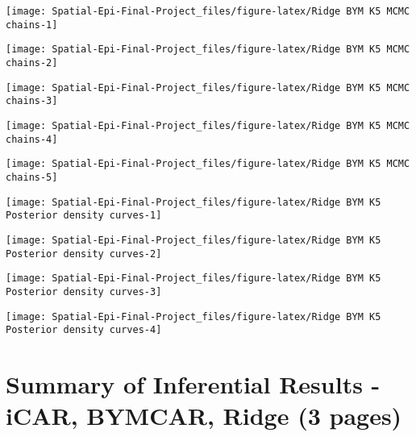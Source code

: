 \documentclass[]{article}
\begin{document}
\begin{center}\texttt{[image: Spatial-Epi-Final-Project\_files/figure-latex/Ridge BYM K5 MCMC chains-1]} \end{center}

\begin{center}\texttt{[image: Spatial-Epi-Final-Project\_files/figure-latex/Ridge BYM K5 MCMC chains-2]} \end{center}

\begin{center}\texttt{[image: Spatial-Epi-Final-Project\_files/figure-latex/Ridge BYM K5 MCMC chains-3]} \end{center}

\begin{center}\texttt{[image: Spatial-Epi-Final-Project\_files/figure-latex/Ridge BYM K5 MCMC chains-4]} \end{center}

\begin{center}\texttt{[image: Spatial-Epi-Final-Project\_files/figure-latex/Ridge BYM K5 MCMC chains-5]} \end{center}

\begin{center}\texttt{[image: Spatial-Epi-Final-Project\_files/figure-latex/Ridge BYM K5 Posterior density curves-1]} \end{center}

\begin{center}\texttt{[image: Spatial-Epi-Final-Project\_files/figure-latex/Ridge BYM K5 Posterior density curves-2]} \end{center}

\begin{center}\texttt{[image: Spatial-Epi-Final-Project\_files/figure-latex/Ridge BYM K5 Posterior density curves-3]} \end{center}

\begin{center}\texttt{[image: Spatial-Epi-Final-Project\_files/figure-latex/Ridge BYM K5 Posterior density curves-4]} \end{center}

\hypertarget{summary-of-inferential-results---icar-bymcar-ridge-3-pages}{%
\section{Summary of Inferential Results - iCAR, BYMCAR, Ridge (3
pages)}\label{summary-of-inferential-results---icar-bymcar-ridge-3-pages}}
\end{document}
